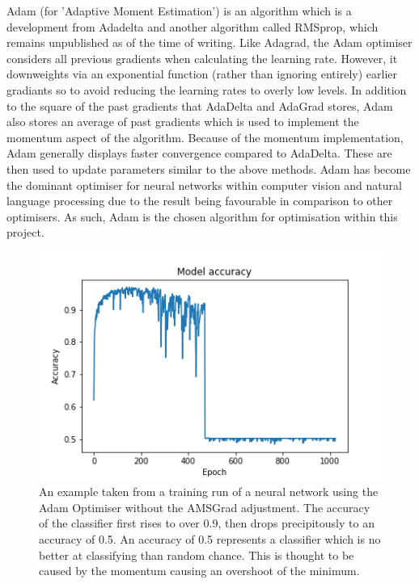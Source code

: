 \documentclass[a4paper,fleqn,usenatbib]{mnras}
\begin{document}
 Adam (for 'Adaptive Moment Estimation') is an algorithm which is a development from Adadelta and another algorithm called RMSprop, which remains unpublished as of the time of writing. Like Adagrad, the Adam optimiser considers all previous gradients when calculating the learning rate. However, it downweights via an exponential function (rather than ignoring entirely) earlier gradiants so to avoid reducing the learning rates to overly low levels. In addition to the square of the past gradients that AdaDelta and AdaGrad stores, Adam also stores an average of past gradients which is used to implement the momentum aspect of the algorithm. Because of the momentum implementation, Adam generally displays faster convergence compared to AdaDelta. These are then used to update parameters similar to the above methods. \citep{Adam} Adam has become the dominant optimiser for neural networks within computer vision and natural language processing due to the result being favourable in comparison to other optimisers. As such, Adam is the chosen algorithm for optimisation within this project.
 

 \begin{figure}
 \includegraphics[width=\columnwidth]{../Figures/CNN_zeroing_accuracy}	
 \caption{An example taken from a training run of a neural network using the Adam Optimiser without the AMSGrad adjustment. The accuracy of the classifier first rises to over 0.9, then drops precipitously to an accuracy of 0.5. An accuracy of 0.5 represents a classifier which is no better at classifying than random chance. This is thought to be caused by the momentum causing an overshoot of the minimum. \label{figure:zeroing}}
 \end{figure}
\end{document}
